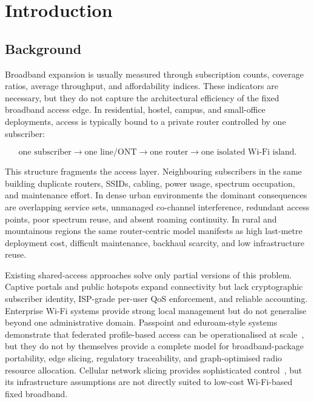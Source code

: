 \chapter{Introduction}
\label{ch:intro}

\section{Background}
\label{sec:background}

Broadband expansion is usually measured through subscription counts, coverage ratios, average throughput, and affordability indices. These indicators are necessary, but they do not capture the architectural efficiency of the fixed broadband access edge. In residential, hostel, campus, and small-office deployments, access is typically bound to a private router controlled by one subscriber:

\begin{equation}
  \text{one subscriber} \to \text{one line/ONT} \to \text{one router} \to \text{one isolated Wi-Fi island.}
  \label{eq:router-centric}
\end{equation}

This structure fragments the access layer. Neighbouring subscribers in the same building duplicate routers, SSIDs, cabling, power usage, spectrum occupation, and maintenance effort. In dense urban environments the dominant consequences are overlapping service sets, unmanaged co-channel interference, redundant access points, poor spectrum reuse, and absent roaming continuity. In rural and mountainous regions the same router-centric model manifests as high last-metre deployment cost, difficult maintenance, backhaul scarcity, and low infrastructure reuse.

Existing shared-access approaches solve only partial versions of this problem. Captive portals and public hotspots expand connectivity but lack cryptographic subscriber identity, ISP-grade per-user QoS enforcement, and reliable accounting. Enterprise Wi-Fi systems provide strong local management but do not generalise beyond one administrative domain. Passpoint and eduroam-style systems demonstrate that federated profile-based access can be operationalised at scale~\cite{rfc7593,wba-openroaming}, but they do not by themselves provide a complete model for broadband-package portability, edge slicing, regulatory traceability, and graph-optimised radio resource allocation. Cellular network slicing provides sophisticated control~\cite{3gpp-ts23501}, but its infrastructure assumptions are not directly suited to low-cost Wi-Fi-based fixed broadband.

